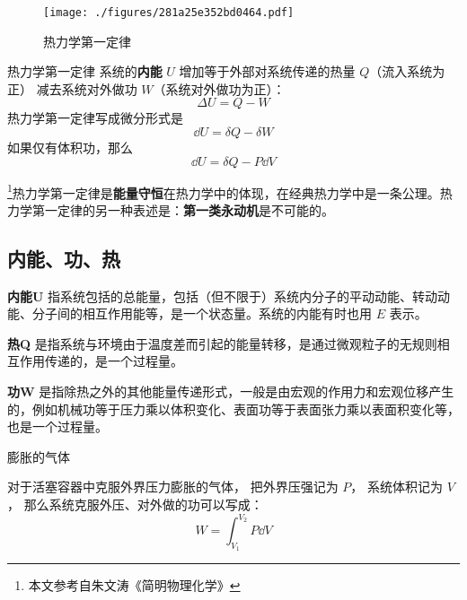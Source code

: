 
\begin{issues}
\issueDraft
\end{issues}


\begin{figure}[ht]
\centering
\texttt{[image: ./figures/281a25e352bd0464.pdf]}
\caption{热力学第一定律} \label{fig_Th1Law_1}
\end{figure}

\begin{theorem}{热力学第一定律}
系统的\textbf{内能} $U$ 增加等于外部对系统传递的热量 $Q$（流入系统为正） 减去系统对外做功 $W$（系统对外做功为正）：
\begin{equation}\label{eq_Th1Law_1}
\Delta U = Q - W
\end{equation}
热力学第一定律写成微分形式是
\begin{equation} \label{eq_Th1Law_2}
\dd U = \delta Q - \delta W
\end{equation}
如果仅有体积功，那么
\begin{equation}
\dd U = \delta Q - P \dd V
\end{equation}
\end{theorem}

\footnote{本文参考自朱文涛《简明物理化学》}热力学第一定律是\textbf{能量守恒}在热力学中的体现，在经典热力学中是一条公理。热力学第一定律的另一种表述是：\textbf{第一类永动机}是不可能的。

\subsection{内能、功、热}
\textbf{内能U} 指系统包括的总能量，包括（但不限于）系统内分子的平动动能、转动动能、分子间的相互作用能等，是一个状态量。系统的内能有时也用 $E$ 表示。 

\textbf{热Q} 是指系统与环境由于温度差而引起的能量转移，是通过微观粒子的无规则相互作用传递的，是一个过程量。

\textbf{功W} 是指除热之外的其他能量传递形式，一般是由宏观的作用力和宏观位移产生的，例如机械功等于压力乘以体积变化、表面功等于表面张力乘以表面积变化等，也是一个过程量。

\begin{example}{膨胀的气体}

对于活塞容器中克服外界压力膨胀的气体， 把外界压强记为 $P$， 系统体积记为 $V$， 那么系统克服外压、对外做的功可以写成：
\begin{equation}
W = \int_{V_1}^{V_2} P \dd{V}
\end{equation}
\end{example}

